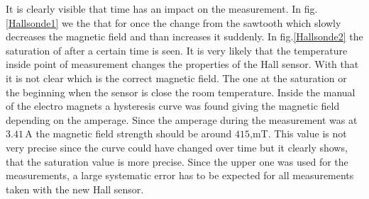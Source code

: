 It is clearly visible that time has an impact on the measurement. In fig.\ref{Hallsonde1} we the that for once the change from the sawtooth which slowly decreases the magnetic field and than increases it suddenly. In fig.\ref{Hallsonde2} the saturation of after a certain time is seen. It is very likely that the temperature inside point of measurement changes the properties of the Hall sensor. With that it is not clear which is the correct magnetic field. The one at the saturation or the beginning when the sensor is close the room temperature. Inside the manual of the electro magnets a hysteresis curve was found giving the magnetic field depending on the amperage.\cite{Electromagnet} Since the amperage during the measurement was at $3.41$\,A the magnetic field strength should be around $415$,mT. This value is not very precise since the curve could have changed over time but it clearly shows, that the saturation value is more precise. Since the upper one was used for the measurements, a large systematic error has to be expected for all measurements taken with the new Hall sensor.